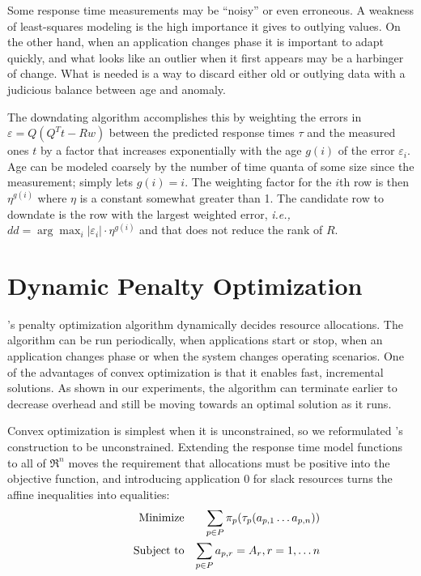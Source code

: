 Some response time measurements may be ``noisy'' or even erroneous.
A weakness of least-squares modeling is the high importance it gives to outlying values.
On the other hand, when an application changes phase it is important to adapt quickly,
and what looks like an outlier when it first appears may be a harbinger of change.
What is needed is a way to discard either old or outlying data
with a judicious balance between age and anomaly.

The downdating algorithm accomplishes this by weighting the errors in $\varepsilon = Q(Q^Tt - Rw)$
between the predicted response times $\tau$ and the measured ones $t$ by a factor
that increases exponentially with the age $g(i)$ of the error $\varepsilon_i$.
Age can be modeled coarsely by the number of time quanta of some size since the measurement;
\pacora simply lets $g(i) = i$.
The weighting factor for the $i$th row is then $\eta^{g(i)}$ where $\eta$ is a constant somewhat greater than 1.
The candidate row to downdate is the row with the largest weighted error, \emph{i.e.,}
$dd = \arg\max_i |\varepsilon_i| \cdot \eta^{g(i)}$ and that does not reduce the rank of $R$.



\section{Dynamic Penalty Optimization}\label{dyn_opt}


\pacora's penalty optimization algorithm dynamically decides resource allocations. The algorithm can be run periodically, when applications start or stop, when an application changes phase or when the system changes operating scenarios.  One of the advantages of convex optimization is that it enables fast, incremental solutions.  As shown in our experiments, the algorithm can terminate earlier to decrease overhead and still be moving towards an optimal solution as it runs.  %

Convex optimization is simplest when it is unconstrained, so we reformulated \pacora's construction to be unconstrained.
Extending the response time model functions to all of $\Re^n$
moves the requirement that allocations must be positive into the objective function,
and introducing application 0 for slack resources turns the affine inequalities into equalities:
\begin{eqnarray*}
& \makebox[1in][r]{Minimize}   & \sum_{p\in P} {\pi_p(\tau_p(a_{p,1}\ldots a_{p,n}))}  \\
& \makebox[1in][r]{Subject to} & \sum_{p\in P} a_{p,r} = A_r, r = 1,\ldots n           \\
\end{eqnarray*}

